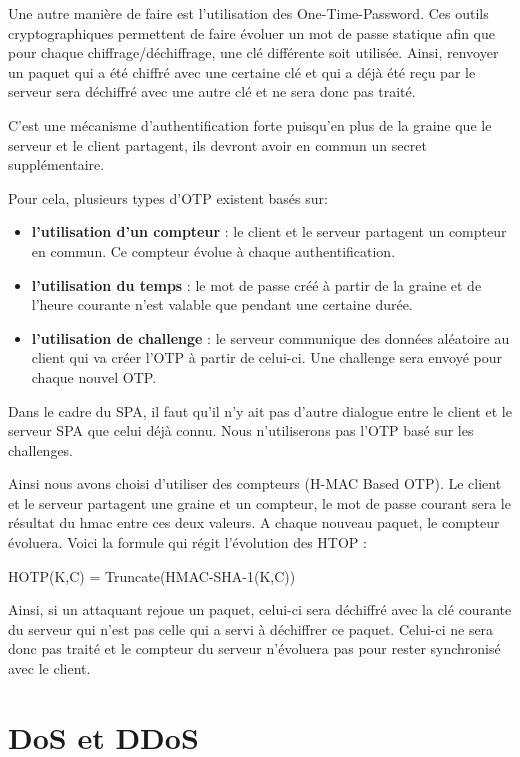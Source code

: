Une autre manière de faire est l'utilisation des One-Time-Password. Ces outils cryptographiques permettent de faire évoluer un mot de passe statique afin que pour chaque chiffrage/déchiffrage, une clé différente soit utilisée. Ainsi, renvoyer un paquet qui a été chiffré avec une certaine clé et qui a déjà été reçu par le serveur sera déchiffré avec une autre clé et ne sera donc pas traité.

C'est une mécanisme d'authentification forte puisqu'en plus de la graine que le serveur et le client partagent, ils devront avoir en commun un secret supplémentaire.

Pour cela, plusieurs types d'OTP existent basés sur:
\begin{itemize}
\item \textbf{l'utilisation d'un compteur} : le client et le serveur partagent un compteur en commun. Ce compteur évolue à chaque authentification.
\item \textbf{l'utilisation du temps} : le mot de passe créé à partir de la graine et de l'heure courante n'est valable que pendant une certaine durée.
\item \textbf{l'utilisation de challenge} : le serveur communique des données aléatoire au client qui va créer l'OTP à partir de celui-ci. Une challenge sera envoyé pour chaque nouvel OTP.
\end{itemize}
\vspace{0.5cm}
Dans le cadre du SPA, il faut qu'il n'y ait pas d'autre dialogue entre le client et le serveur SPA que celui déjà connu. Nous n'utiliserons pas l'OTP basé sur les challenges.

Ainsi nous avons choisi d'utiliser des compteurs (H-MAC Based OTP). Le client et le serveur partagent une graine et un compteur, le mot de passe courant sera le résultat du hmac entre ces deux valeurs. A chaque nouveau paquet, le compteur évoluera. Voici la formule qui régit l'évolution des HTOP :
\centerline{HOTP(K,C) = Truncate(HMAC-SHA-1(K,C))}

Ainsi, si un attaquant rejoue un paquet, celui-ci sera déchiffré avec la clé courante du serveur qui n'est pas celle qui a servi à déchiffrer ce paquet. Celui-ci ne sera donc pas traité et le compteur du serveur n'évoluera pas pour rester synchronisé avec le client.

\clearpage

\section{DoS et DDoS}

